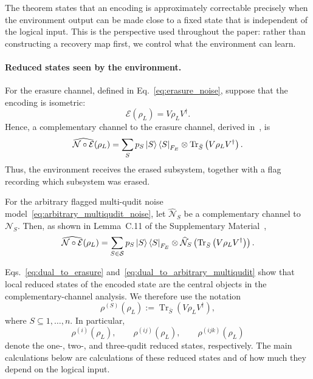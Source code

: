 \documentclass[10pt,twocolumn,superscriptaddress,aps,amsmath,amssymb,citeautoscript,floatfix,prx]{revtex4-2}
\theoremstyle{plain}
\theoremstyle{plain}
\theoremstyle{plain}
\theoremstyle{plain}
\theoremstyle{plain}
\theoremstyle{plain}
\begin{document}
The theorem states that an encoding is approximately correctable precisely when the environment output can be made close to a fixed state that is independent of the logical input. This is the perspective used throughout the paper: rather than constructing a recovery map first, we control what the environment can learn.

\paragraph{Reduced states seen by the environment.}

For the erasure channel, defined in Eq.~\eqref{eq:erasure_noise}, suppose that the encoding is isometric:
\begin{equation}\label{eq:enc_isom}
\mathcal E(\rho_L)
=
V\rho_LV^\dagger .
\end{equation}
Hence, a complementary channel to the erasure channel, derived in~\cite{Faist2020}, is
\begin{equation}\label{eq:dual_to_erasure}
\widehat{\mathcal N\circ\mathcal E}(\rho_L)
=
\sum_S
p_S
\ket S\bra S_{F_E}
\otimes
\operatorname{Tr}_{\bar S}
\left(
V\rho_LV^\dagger
\right).
\end{equation}
Thus, the environment receives the erased subsystem, together with a flag recording which subsystem was erased.

For the arbitrary flagged multi-qudit noise model~\eqref{eq:arbitrary_multiqudit_noise}, let $\widehat{\mathcal N}_S$ be a complementary channel to $\mathcal N_S$. Then, as shown in Lemma~C.11 of the Supplementary Material~\cite{SuppMat},
\begin{equation}\label{eq:dual_to_arbitrary_multiqudit}
\widehat{\mathcal N\circ\mathcal E}(\rho_L)
=
\sum_{S\in\mathcal S}
p_S
\ket S\bra S_{F_E}
\otimes
\widehat{\mathcal N}_S
\left(
\operatorname{Tr}_{\bar S}
\left(
V\rho_LV^\dagger
\right)
\right).
\end{equation}

Eqs.~\eqref{eq:dual_to_erasure} and~\eqref{eq:dual_to_arbitrary_multiqudit} show that local reduced states of the encoded state are the central objects in the complementary-channel analysis. We therefore use the notation
\begin{equation}\label{eq:reduced_state}
\rho^{(S)}(\rho_L)
:=
\operatorname{Tr}_{\bar S}
\left(
V\rho_LV^\dagger
\right),
\end{equation}
where $S\subseteq{1,\ldots,n}$. In particular,
$$
\rho^{(i)}(\rho_L),
\qquad
\rho^{(ij)}(\rho_L),
\qquad
\rho^{(ijk)}(\rho_L)
$$
denote the one-, two-, and three-qudit reduced states, respectively. The main calculations below are calculations of these reduced states and of how much they depend on the logical input.
\end{document}
